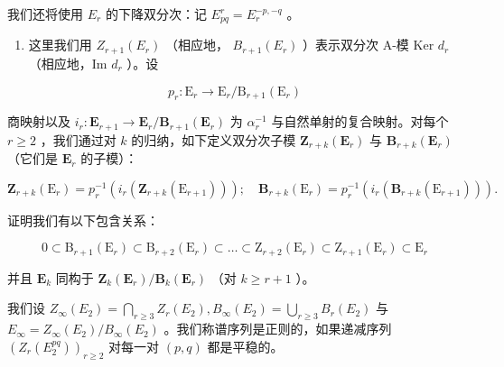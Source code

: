 我们还将使用 \(E_{r}\) 的下降双分次：记 \(E_{pq}^{r} = E_{r}^{-p, -q}\) 。

\begin{enumerate}
\def\labelenumi{\alph{enumi})}
\tightlist
\item
  这里我们用 \(Z_{r+1}(E_r)\) （相应地， \(B_{r+1}(E_r)\) ）表示双分次 A-模 Ker \(d_r\) （相应地，Im \(d_r\) ）。设
\end{enumerate}

\[
p _ {r}: \mathrm{E} _ {r} \rightarrow \mathrm{E} _ {r} / \mathrm{B} _ {r + 1} (\mathrm{E} _ {r})
\]

商映射以及 \(i_{r}: \mathbf{E}_{r+1} \to \mathbf{E}_{r}/\mathbf{B}_{r+1}(\mathbf{E}_{r})\) 为 \(\alpha_{r}^{-1}\) 与自然单射的复合映射。对每个 \(r \geqslant 2\) ，我们通过对 \(k\) 的归纳，如下定义双分次子模 \(\mathbf{Z}_{r+k}(\mathbf{E}_{r})\) 与 \(\mathbf{B}_{r+k}(\mathbf{E}_{r})\) （它们是 \(\mathbf{E}_{r}\) 的子模）：

\[
\mathbf {Z} _ {r + k} (\mathrm{E} _ {r}) = p _ {r} ^ {- 1} \left(i _ {r} \left(\mathbf {Z} _ {r + k} (\mathrm{E} _ {r + 1})\right)\right); \quad \mathbf {B} _ {r + k} (\mathrm{E} _ {r}) = p _ {r} ^ {- 1} \left(i _ {r} \left(\mathbf {B} _ {r + k} (\mathrm{E} _ {r + 1})\right)\right).
\]

证明我们有以下包含关系：

\[
0 \subset \mathrm{B} _ {r + 1} (\mathrm{E} _ {r}) \subset \mathrm{B} _ {r + 2} (\mathrm{E} _ {r}) \subset \dots \subset \mathrm{Z} _ {r + 2} (\mathrm{E} _ {r}) \subset \mathrm{Z} _ {r + 1} (\mathrm{E} _ {r}) \subset \mathrm{E} _ {r}
\]

并且 \(\mathbf{E}_k\) 同构于 \(\mathbf{Z}_k(\mathbf{E}_r) / \mathbf{B}_k(\mathbf{E}_r)\) （对 \(k\geqslant r + 1\) ）。

我们设 \(Z_{\infty}(E_2) = \bigcap_{r \geqslant 3} Z_r(E_2), B_{\infty}(E_2) = \bigcup_{r \geqslant 3} B_r(E_2)\) 与 \(E_{\infty} = Z_{\infty}(E_2)/B_{\infty}(E_2)\) 。我们称谱序列是正则的，如果递减序列 \((Z_r(E_2^{pq}))_{r \geqslant 2}\) 对每一对 \((p, q)\) 都是平稳的。

